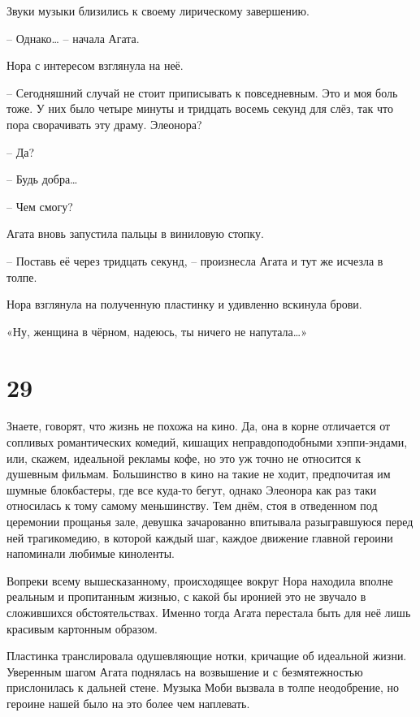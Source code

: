 \documentclass[
  a5paperpaper,
  DIV=11,
  numbers=noendperiod]{scrreprt}
\begin{document}
Звуки музыки близились к своему лирическому завершению.

-- Однако\ldots{} -- начала Агата.

Нора с интересом взглянула на неё.

-- Сегодняшний случай не стоит приписывать к повседневным. Это и моя
боль тоже. У них было четыре минуты и тридцать восемь секунд для слёз,
так что пора сворачивать эту драму. Элеонора?

-- Да?

-- Будь добра\ldots{}

-- Чем смогу?

Агата вновь запустила пальцы в виниловую стопку.

-- Поставь её через тридцать секунд, -- произнесла Агата и тут же
исчезла в толпе.

Нора взглянула на полученную пластинку и удивленно вскинула брови.

«Ну, женщина в чёрном, надеюсь, ты ничего не напутала\ldots»

\section*{29}\label{29}


Знаете, говорят, что жизнь не похожа на кино. Да, она в корне отличается
от сопливых романтических комедий, кишащих неправдоподобными
хэппи-эндами, или, скажем, идеальной рекламы кофе, но это уж точно не
относится к душевным фильмам. Большинство в кино на такие не ходит,
предпочитая им шумные блокбастеры, где все куда-то бегут, однако
Элеонора как раз таки относилась к тому самому меньшинству. Тем днём,
стоя в отведенном под церемонии прощанья зале, девушка зачарованно
впитывала разыгравшуюся перед ней трагикомедию, в которой каждый шаг,
каждое движение главной героини напоминали любимые киноленты.

Вопреки всему вышесказанному, происходящее вокруг Нора находила вполне
реальным и пропитанным жизнью, с какой бы иронией это не звучало в
сложившихся обстоятельствах. Именно тогда Агата перестала быть для неё
лишь красивым картонным образом.

Пластинка транслировала одушевляющие нотки, кричащие об идеальной жизни.
Уверенным шагом Агата поднялась на возвышение и с безмятежностью
прислонилась к дальней стене. Музыка Моби вызвала в толпе неодобрение,
но героине нашей было на это более чем наплевать.
\end{document}

